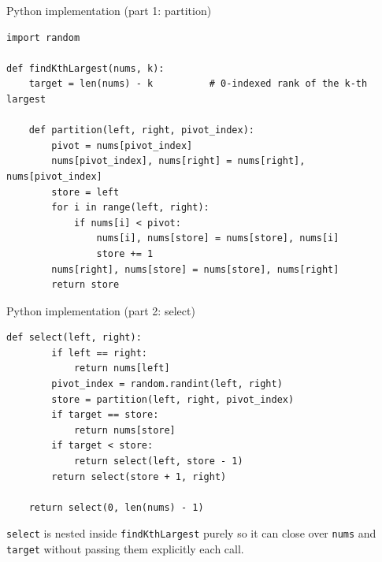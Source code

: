 \documentclass[11pt,aspectratio=169]{beamer}
\begin{document}
\begin{frame}[fragile]{Python implementation (part 1: partition)}
  \begin{lstlisting}[style=py]
import random

def findKthLargest(nums, k):
    target = len(nums) - k          # 0-indexed rank of the k-th largest

    def partition(left, right, pivot_index):
        pivot = nums[pivot_index]
        nums[pivot_index], nums[right] = nums[right], nums[pivot_index]
        store = left
        for i in range(left, right):
            if nums[i] < pivot:
                nums[i], nums[store] = nums[store], nums[i]
                store += 1
        nums[right], nums[store] = nums[store], nums[right]
        return store
  \end{lstlisting}
\end{frame}

\begin{frame}[fragile]{Python implementation (part 2: select)}
  \begin{lstlisting}[style=py]
    def select(left, right):
        if left == right:
            return nums[left]
        pivot_index = random.randint(left, right)
        store = partition(left, right, pivot_index)
        if target == store:
            return nums[store]
        if target < store:
            return select(left, store - 1)
        return select(store + 1, right)

    return select(0, len(nums) - 1)
  \end{lstlisting}
  \vspace{0.5em}
  \texttt{select} is nested inside \texttt{findKthLargest} purely so it can close over
  \texttt{nums} and \texttt{target} without passing them explicitly each call.
\end{frame}
\end{document}
